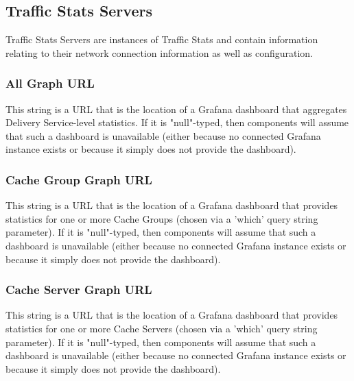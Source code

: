 %
%

\subsection{Traffic Stats Servers}
Traffic Stats Servers are instances of Traffic Stats and contain information
relating to their network connection information as well as configuration.

\subsubsection{All Graph URL}
This string is a URL that is the location of a Grafana dashboard that aggregates
Delivery Service-level statistics. If it is "null"-typed, then components will
assume that such a dashboard is unavailable (either because no connected Grafana
instance exists or because it simply does not provide the dashboard).

\subsubsection{Cache Group Graph URL}
This string is a URL that is the location of a Grafana dashboard that provides
statistics for one or more Cache Groups (chosen via a 'which' query string
parameter). If it is "null"-typed, then components will assume that such a
dashboard is unavailable (either because no connected Grafana instance exists or
because it simply does not provide the dashboard).

\subsubsection{Cache Server Graph URL}
This string is a URL that is the location of a Grafana dashboard that provides
statistics for one or more Cache Servers (chosen via a 'which' query string
parameter). If it is "null"-typed, then components will assume that such a
dashboard is unavailable (either because no connected Grafana instance exists or
because it simply does not provide the dashboard).

